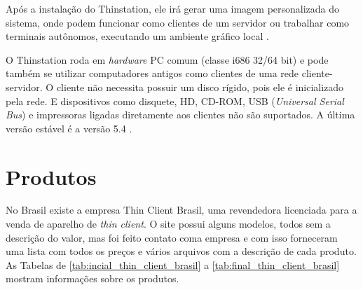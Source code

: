 \documentclass[
	12pt,				%
	openright,			%
	twoside,			%
	a4paper,			%
	chapter=TITLE,		%
	english,			%
	brazil				%
	]{abntex2}
\begin{document}
Após a instalação do Thinstation, ele irá gerar uma imagem personalizada do sistema, onde podem funcionar como clientes de um servidor ou trabalhar como terminais autônomos, executando um ambiente gráfico local \cite{Thinstationl}.

O Thinstation roda em \textit{hardware} PC comum (classe i686 32/64 bit) e pode também se utilizar computadores antigos como clientes de uma rede cliente-servidor. O cliente não necessita possuir um disco rígido, pois ele é inicializado pela rede. E dispositivos como disquete, HD, CD-ROM, USB (\textit{Universal Serial Bus}) e impressoras ligadas diretamente aos clientes não são suportados. A última versão estável é a versão 5.4 \cite{Thinstationl,piaui}.


\section{Produtos}

No Brasil existe a empresa Thin Client Brasil, uma revendedora licenciada para a venda de aparelho de \textit{thin client}. O site possui alguns modelos, todos sem a descrição do valor, mas foi feito contato coma empresa e com isso forneceram uma lista com todos os preços e vários arquivos com a descrição de cada produto. As Tabelas de \ref{tab:incial_thin_client_brasil} a \ref{tab:final_thin_client_brasil} mostram informações sobre os produtos.

 
\newpage

 \begin{table}[h!]
\end{table}
 
\end{document}
